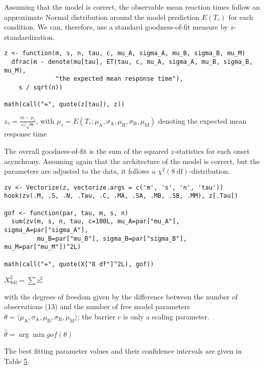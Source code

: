 Assuming that the model is correct, the observable mean reaction times
follow an approximate Normal distribution around the model prediction
\(E(T_\tau)\) for each condition. We can, therefore, use a standard
goodness-of-fit measure by \(z\)-standardization.

\begin{verbatim}
z <- function(m, s, n, tau, c, mu_A, sigma_A, mu_B, sigma_B, mu_M)
  dfrac(m - denote(mu[tau], ET(tau, c, mu_A, sigma_A, mu_B, sigma_B, mu_M),
              "the expected mean response time"),
    s / sqrt(n))

math(call("=", quote(z[tau]), z))
\end{verbatim}

\({{z}_{\tau}}{=}{\displaystyle{\frac{{m}{-}{{\mu}_{\tau}}}{{s}{/}{\sqrt{n}}}}}\),
with
\({{\mu}_{\tau}}{=}{E{\left({{T}_{\tau}}{;}{{{\mu}_{\mathrm{A}}}{{,}{{\sigma}_{\mathrm{A}}}{{,}{{\mu}_{\mathrm{B}}}{{,}{{\sigma}_{\mathrm{B}}}{{,}{{\mu}_{\mathrm{M}}}}}}}}\right)}}\)
denoting the expected mean response time

The overall goodness-of-fit is the sum of the squared \(z\)-statistics for
each onset asynchrony. Assuming again that the architecture of the model
is correct, but the parameters are adjusted to the data, it follows a
\(\chi^2(8\ \mathrm{df})\)-distribution.

\begin{verbatim}
zv <- Vectorize(z, vectorize.args = c('m', 's', 'n', 'tau'))
hook(zv(.M, .S, .N, .Tau, .C, .MA, .SA, .MB, .SB, .MM), z[.Tau])

gof <- function(par, tau, m, s, n)
  sum(zv(m, s, n, tau, c=100L, mu_A=par["mu_A"], sigma_A=par["sigma_A"], 
         mu_B=par["mu_B"], sigma_B=par["sigma_B"], mu_M=par["mu_M"])^2L)

math(call("=", quote(X["8 df"]^2L), gof))
\end{verbatim}

\({{X}_{\mathrm{8 df}}^{2}}{=}{\sum{{z}_{\tau}^{2}}}\)

with the degrees of freedom given by the difference between the number
of observations (13) and the number of free model parameters
\(\theta = \langle\mu_{\mathrm A}, \sigma_{\mathrm A}, \mu_{\mathrm B}, \sigma_{\mathrm B}, \mu_{\mathrm M}\rangle\);
the barrier \(c\) is only a scaling parameter.

\({\hat{\theta}}{=}{\arg\min{gof{\left(\theta\right)}}}\)

The best fitting parameter values and their confidence intervals are
given in Table \protect\hyperlink{tab:params}{5}.

